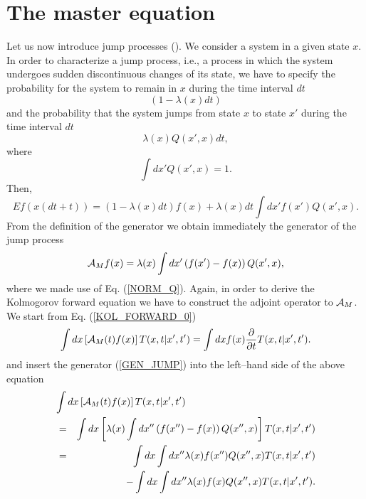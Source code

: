 \section{The master equation}
Let us now introduce jump processes (\cite{DAVIES,FELLER}).
We consider a system in a given state $x$.  
In order to characterize a jump process, i.e., a process
in which the system undergoes sudden discontinuous changes of its state,
we have to specify the probability for 
the system to remain in $x$ during the time interval $dt$ 
\begin{equation*}
(1-\lambda(x) dt)
\end{equation*}
and the probability that the system jumps from state $x$ to state
$x'$ during the time interval $dt$ 
\begin{equation*}
\lambda(x) Q(x',x) dt,
\end{equation*}
where
\begin{equation}
\label{NORM_Q}
\int dx' Q(x',x) =1.
\end{equation}
Then,
\begin{equation*}
Ef(x(dt+t)) = (1-\lambda(x)dt) f(x)
   + \lambda(x) dt \int dx'f(x') Q(x',x).
\end{equation*}
From the definition of the generator we obtain immediately the
generator of the jump process
\begin{equation}
\label{GEN_JUMP}
{\cal{A}}_M f(x) = \lambda(x) \int dx' \left( f(x') 
-f(x)\right)Q(x',x),
\end{equation}
where we made use of Eq. (\ref{NORM_Q}).
Again, in order to derive the Kolmogorov forward equation we have 
to construct the adjoint operator to ${\cal{A}}_M$.
We start from Eq. (\ref{KOL_FORWARD_0})  
\begin{equation}
\label{KOL_FORWARD_J0}
\int dx \left[ {\cal{A}}_M(t) f(x) \right] T(x,t|x',t') =
  \int dx f(x) \frac{\partial}{\partial t} T(x,t|x',t').
\end{equation}
and insert the generator (\ref{GEN_JUMP}) into the left--hand side 
of the above equation
\begin{eqnarray*}
\lefteqn{\int dx \left[ {\cal{A}}_M(t) f(x) \right] T(x,t|x',t')} 
\\
&=& \int dx \left[ \lambda(x)
       \int dx'' \left(f(x'') -f(x) \right) Q(x'',x) \right] T(x,t|x',t') 
       \\
& = & \int dx \int dx'' \lambda(x) f(x'') Q(x'',x) T(x,t|x',t') \\
& & - \int dx \int dx'' \lambda(x) f(x) Q(x'',x) T(x,t|x',t').
\end{eqnarray*}
